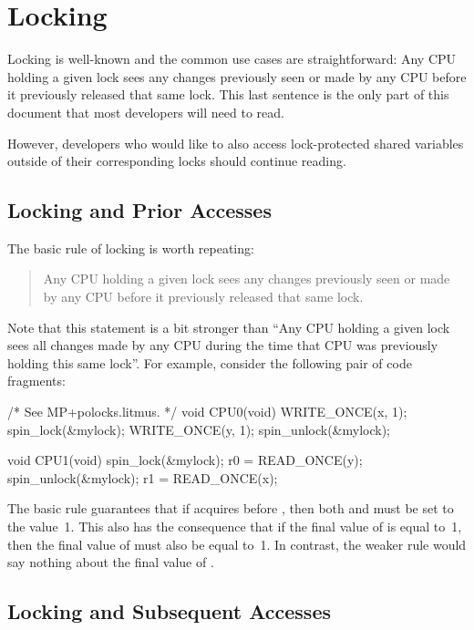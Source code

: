 \chapter{Locking}

Locking is well-known and the common use cases are straightforward:
Any CPU holding a given lock sees any changes previously seen or made by any
CPU before it previously released that same lock.
This last sentence is the only part of this document that most developers
will need to read.

However, developers who would like to also access lock-protected shared
variables outside of their corresponding locks should continue reading.


\section{Locking and Prior Accesses}

The basic rule of locking is worth repeating:

\begin{quote}
	Any CPU holding a given lock sees any changes previously seen
	or made by any CPU before it previously released that same lock.
\end{quote}

Note that this statement is a bit stronger than ``Any CPU holding a
given lock sees all changes made by any CPU during the time that CPU was
previously holding this same lock''.
For example, consider the following pair of code fragments:

\begin{VerbatimU}
	/* See MP+polocks.litmus. */
	void CPU0(void)
	{
		WRITE_ONCE(x, 1);
		spin_lock(&mylock);
		WRITE_ONCE(y, 1);
		spin_unlock(&mylock);
	}

	void CPU1(void)
	{
		spin_lock(&mylock);
		r0 = READ_ONCE(y);
		spin_unlock(&mylock);
		r1 = READ_ONCE(x);
	}
\end{VerbatimU}

The basic rule guarantees that if  acquires  before
, then both  and  must be set to the value~1.
This also has the consequence that if the final value of  is equal to~1,
then the final value of  must also be equal to~1.
In contrast, the weaker rule would say nothing about the final value of .


\section{Locking and Subsequent Accesses}

